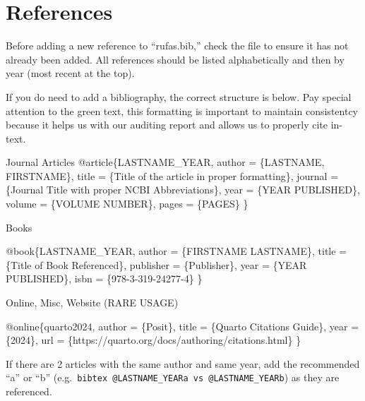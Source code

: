 \documentclass[
  letterpaper,
  oneside,
  openany]{scrbook}
\newenvironment{Shaded}{\begin{snugshade}}{\end{snugshade}}
\newcommand{\CommentTok}[1]{\textcolor[rgb]{0.37,0.37,0.37}{#1}}
\newcommand{\DataTypeTok}[1]{\textcolor[rgb]{0.68,0.00,0.00}{#1}}
\newcommand{\NormalTok}[1]{\textcolor[rgb]{0.00,0.23,0.31}{#1}}
\newcommand{\OtherTok}[1]{\textcolor[rgb]{0.00,0.23,0.31}{#1}}
\newcommand{\VariableTok}[1]{\textcolor[rgb]{0.07,0.07,0.07}{#1}}
\begin{document}
\section{References}\label{references}

Before adding a new reference to ``rufas.bib,'' check the file to ensure
it has not already been added. All references should be listed
alphabetically and then by year (most recent at the top).

If you do need to add a bibliography, the correct structure is below.
Pay special attention to the green text, this formatting is important to
maintain consistentcy because it helps us with our auditing report and
allows us to properly cite in-text.

\begin{Shaded}
\begin{Highlighting}[]
\CommentTok{Journal Articles}
\VariableTok{@article}\NormalTok{\{}\OtherTok{LASTNAME\_YEAR}\NormalTok{,}
  \DataTypeTok{author}\NormalTok{ = \{LASTNAME, FIRSTNAME\},}
  \DataTypeTok{title}\NormalTok{ = \{Title of the article in proper formatting\},}
  \DataTypeTok{journal}\NormalTok{ = \{Journal Title with proper NCBI Abbreviations\},}
  \DataTypeTok{year}\NormalTok{ = \{YEAR PUBLISHED\},}
  \DataTypeTok{volume}\NormalTok{ = \{VOLUME NUMBER\},}
  \DataTypeTok{pages}\NormalTok{ = \{PAGES\}}
\NormalTok{\}}

\CommentTok{Books }

\VariableTok{@book}\NormalTok{\{}\OtherTok{LASTNAME\_YEAR}\NormalTok{,}
  \DataTypeTok{author}\NormalTok{ = \{FIRSTNAME LASTNAME\},}
  \DataTypeTok{title}\NormalTok{ = \{Title of Book Referenced\},}
  \DataTypeTok{publisher}\NormalTok{ = \{Publisher\},}
  \DataTypeTok{year}\NormalTok{ = \{YEAR PUBLISHED\},}
  \DataTypeTok{isbn}\NormalTok{ = \{978{-}3{-}319{-}24277{-}4\}}
\NormalTok{\}}

\CommentTok{Online, Misc, Website (RARE USAGE)}

\VariableTok{@online}\NormalTok{\{}\OtherTok{quarto2024}\NormalTok{,}
  \DataTypeTok{author}\NormalTok{ = \{Posit\},}
  \DataTypeTok{title}\NormalTok{ = \{Quarto Citations Guide\},}
  \DataTypeTok{year}\NormalTok{ = \{2024\},}
  \DataTypeTok{url}\NormalTok{ = \{https://quarto.org/docs/authoring/citations.html\}}
\NormalTok{\}}
\end{Highlighting}
\end{Shaded}

If there are 2 articles with the same author and same year, add the
recommended ``a'' or ``b''
(e.g.~\texttt{bibtex\ @LASTNAME\_YEARa\ vs\ @LASTNAME\_YEARb}) as they
are referenced.
\end{document}
